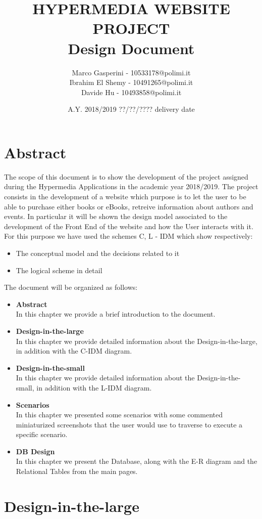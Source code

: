 \documentclass[12pt,a4paper]{article}
\title{\textbf{\Huge{HYPERMEDIA WEBSITE PROJECT}} \\ \large Design Document}
\author{Marco Gasperini - 10533178@polimi.it\\ Ibrahim El Shemy - 10491265@polimi.it \\ Davide Hu - 10493858@polimi.it}
\date{A.Y. 2018/2019 ??/??/???? delivery date}
\begin{document}
\maketitle
\newpage
\tableofcontents
\newpage

\section{Abstract}
The scope of this document is to show the development of the project assigned during the Hypermedia Applications in the academic year 2018/2019.
The project consists in the development of a website which purpose is to let the user to be able to purchase either books or eBooks, retreive information about authors and events.
In particular it will be shown the design model associated to the development of the Front End of the website and how the User interacts with it.
For this purpose we have used the schemes C, L - IDM which show respectively:
\begin{itemize}
\item The conceptual model and the decisions related to it
\item The logical scheme in detail
\end{itemize}
The document will be organized as follows:
\begin{itemize}
	\item \textbf{Abstract} \\
	In this chapter we provide a brief introduction to the document.
	\item \textbf{Design-in-the-large} \\
	In this chapter we provide detailed information about the Design-in-the-large, in addition with the C-IDM diagram.
	\item \textbf{Design-in-the-small} \\
	In this chapter we provide detailed information about the Design-in-the-small, in addition with the L-IDM diagram.
	\item \textbf{Scenarios}\\
	In this chapter we presented some scenarios with some commented miniaturized screenshots that the user would use to traverse to execute a specific scenario.
	\item \textbf{DB Design}\\
	In this chapter we present the Database, along with the E-R diagram and the Relational Tables from the main pages.
\end{itemize}

\newpage
\section{Design-in-the-large}
\end{document}
